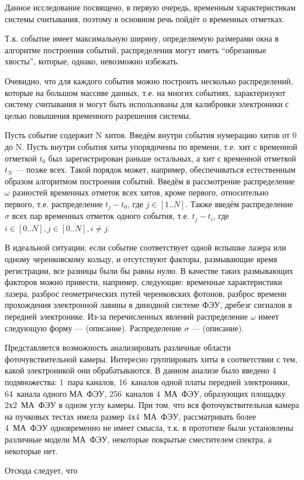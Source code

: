 Данное исследование посвящено, в первую очередь, временным характеристикам системы считывания, поэтому в основном речь пойдёт о временных отметках.

Т.к. событие имеет максимальную ширину, определяемую размерами окна в алгоритме построения событий, распределения могут иметь ``обрезанные хвосты'', которые, однако, невозможно избежать.

Очевидно, что для каждого события можно построить несколько распределений, которые на большом массиве данных, т.е. на многих событиях, характеризуют систему считывания и могут быть использованы для калибровки электроники с целью повышения временного разрешения системы.

Пусть событие содержит N хитов. Введём внутри события нумерацию хитов от 0 до N. Пусть внутри события хиты упорядочены по времени, т.е. хит с временной отметкой $ t_{0} $ был зарегистрирован раньше остальных, а хит с временной отметкой $ t_{N} $ --- позже всех. Такой порядок может, например, обеспечиваться естественным образом алгоритмом построения событий. Введём в рассмотрение распределение $ \omega $ разностей временных отметок всех хитов, кроме первого, относительно первого, т.е. распределение $ t_{j} - t_{0} $, где  $ j \in [1..N] $. Также введём распределение $ \sigma $ всех пар временных отметок одного события, т.е. $ t_{j}-t_{i} $, где $ i \in [0..N], j \in [0..N], i \neq j $.

В идеальной ситуации, если событие соответствует одной вспышке лазера или одному черенковскому кольцу, и отсутствуют факторы, размывающие время регистрации, все разницы были бы равны нулю. В качестве таких размывающих факторов можно привести, например, следующие: временные характеристики лазера, разброс геометрических путей черенковских фотонов, разброс времени прохождения электронной лавины в динодной системе ФЭУ, дребезг сигналов в передней электронике. Из-за перечисленных явлений распределение $ \omega $ имеет следующую форму --- (описание). Распределение $ \sigma $ --- (описание).


Представляется возможность анализировать различные области фоточувствительной камеры. Интересно группировать хиты в соответствии с тем, какой электроникой они обрабатываются. В данном анализе было введено 4 подмножества: 1~пара каналов, 16~каналов одной платы передней электроники, 64~канала одного МА~ФЭУ, 256~каналов 4~МА~ФЭУ, образующих площадку 2х2~МА~ФЭУ в одном углу камеры. При том, что вся фоточувствительная камера на пучковых тестах имела размер 4х4~МА~ФЭУ, рассматривать более 4~МА~ФЭУ одновременно не имеет смысла, т.к. в прототипе были установлены различные модели МА~ФЭУ, некоторые покрытые сместителем спектра, а некоторые нет.

Отсюда следует, что 